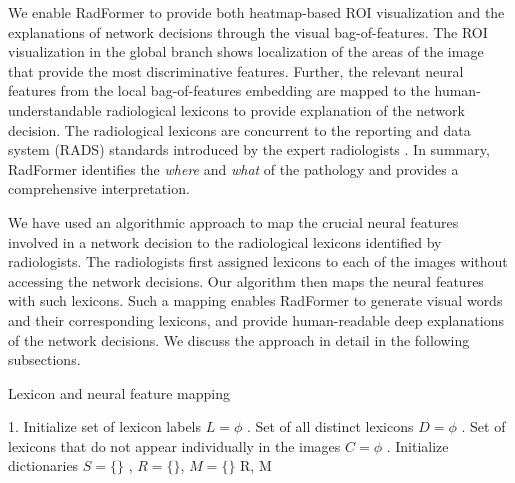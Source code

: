 \documentclass[twocolumn,final]{elsarticle}
\def\myarch{RadFormer\xspace}
\begin{document}
We enable \myarch to provide both heatmap-based ROI visualization and the explanations of network decisions through the visual bag-of-features. The ROI visualization in the global branch shows localization of the areas of the image that provide the most discriminative features. Further, the relevant neural features from the local bag-of-features embedding are mapped to the human-understandable radiological lexicons to provide explanation of the network decision. The radiological lexicons are concurrent to the reporting and data system (RADS) standards introduced by the expert radiologists \citep{gb-rads-paper}. In summary, \myarch identifies the \emph{where} and \emph{what} of the pathology and provides a comprehensive interpretation. 
\par We have used an algorithmic approach to map the crucial neural features involved in a network decision to the radiological lexicons identified by radiologists. The radiologists first assigned lexicons to each of the images without accessing the network decisions. Our algorithm then maps the neural features with such lexicons. Such a mapping enables \myarch to generate visual words and their corresponding lexicons, and provide human-readable deep explanations of the network decisions. We discuss the approach in detail in the following subsections.


\begin{algorithm}[!t]
\small
	\caption{Lexicon and neural feature mapping}
	\label{algo}
	\SetAlgoLined
	1. Initialize set of lexicon labels $L=\phi$ . Set of all distinct lexicons $D=\phi$ . Set of lexicons that do not appear individually in the images $C=\phi$ . Initialize dictionaries $S=\{\}$ ,  $R=\{\}$, $M=\{\}$\;
	\KwRet R, M \;
\end{algorithm}
\end{document}
